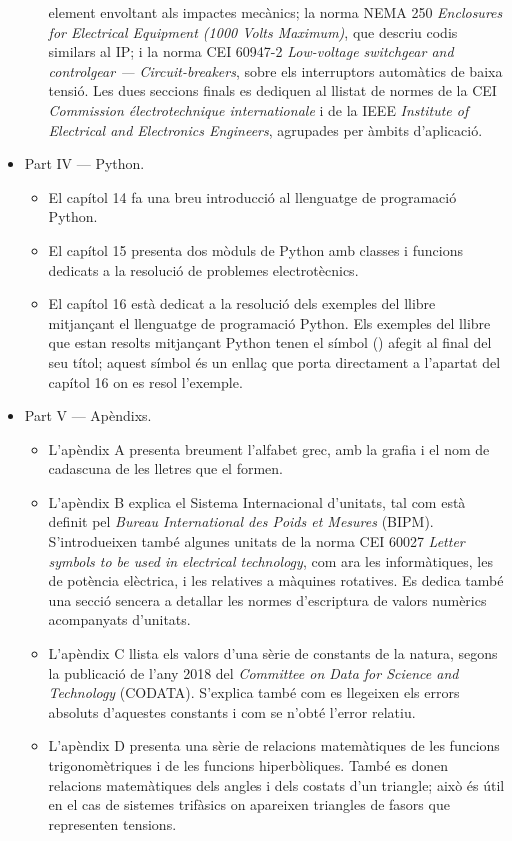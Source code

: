 \begin{itemize}
\begin{itemize}
			element envoltant als impactes mecànics; la norma
			NEMA 250 \textit{Enclosures for Electrical Equipment (1000 Volts Maximum)}, que descriu codis similars al IP; i la norma CEI 60947-2 \textit{Low-voltage switchgear and controlgear --- Circuit-breakers}, sobre els interruptors automàtics de baixa tensió. Les dues seccions finals es dediquen al llistat de normes de la CEI \textit{Commission électrotechnique internationale} i de la IEEE \textit{Institute of Electrical and Electronics Engineers}, agrupades per àmbits d'aplicació.
		\end{itemize}
		\item Part IV --- Python. 
		\begin{itemize}
			\item El capítol 14 fa una breu introducció al llenguatge de programació Python.
			\item El capítol 15 presenta dos mòduls de Python amb classes i funcions dedicats a la resolució de problemes electrotècnics.
			\item El capítol 16 està dedicat  a la resolució dels exemples del llibre mitjançant el llenguatge de programació Python. Els exemples del llibre que estan resolts mitjançant Python tenen el símbol (\faPython) afegit al final del seu títol; aquest símbol és un enllaç que porta directament a l'apartat del capítol 16 on es resol l'exemple.
		\end{itemize}
		\item Part V --- Apèndixs. 
		\begin{itemize}
			\item L'apèndix A presenta breument l'alfabet grec, amb la grafia i el nom de cadascuna de les lletres que el formen.
			\item L'apèndix B explica el Sistema Internacional d'unitats, tal com està definit pel \textit{Bureau International des Poids et Mesures} (BIPM). S'introdueixen també algunes unitats de la norma CEI 60027 \textit{Letter symbols to be used in electrical technology}, com ara les informàtiques, les de potència elèctrica, i les relatives a màquines rotatives. Es dedica també una secció sencera a detallar les normes d'escriptura de valors numèrics acompanyats d'unitats.
			\item L'apèndix C llista els valors d'una sèrie de constants de la natura, segons la  publicació
			de l’any 2018 del \textit{Committee on Data for
			Science and Technology} (CODATA). S'explica també com es llegeixen els errors absoluts d'aquestes constants i com se n'obté l'error relatiu.
			\item L'apèndix D presenta una sèrie de relacions matemàtiques de les funcions trigonomètriques i de les funcions hiperbòliques. També es donen relacions matemàtiques dels angles i dels costats d'un triangle; això és útil en el cas de sistemes trifàsics on apareixen triangles de fasors que representen tensions.

\end{itemize}
\end{itemize}
